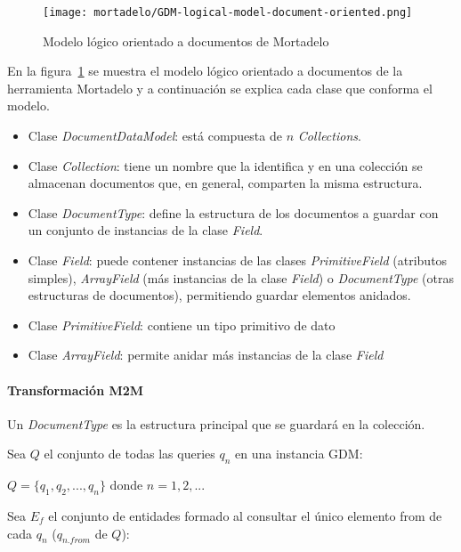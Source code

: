 \begin{figure}[h!t] 
    \centering
    \texttt{[image: mortadelo/GDM-logical-model-document-oriented.png]}
    \caption{Modelo lógico orientado a documentos de Mortadelo}
    \label{img:mortadelo-gdm-logical-model-document-oriented}
\end{figure}


En la figura~\ref{img:mortadelo-gdm-logical-model-document-oriented} se muestra el modelo lógico orientado a documentos de la herramienta Mortadelo y a continuación se explica cada clase que conforma el modelo.


\begin{itemize}
    \item Clase \textit{DocumentDataModel}: está compuesta de $n$ \textit{Collections}.
    \item Clase \textit{Collection}: tiene un nombre que la identifica y en una colección se almacenan documentos que, en general, comparten la misma estructura.
    \item Clase \textit{DocumentType}: define la estructura de los documentos a guardar con un conjunto de instancias de la clase \textit{Field}.
    \item Clase \textit{Field}: puede contener instancias de las clases \textit{PrimitiveField} (atributos simples), \textit{ArrayField} (más instancias de la clase \textit{Field}) o \textit{DocumentType} (otras estructuras de documentos), permitiendo guardar elementos anidados.
    \item Clase \textit{PrimitiveField}: contiene un tipo primitivo de dato
    \item Clase \textit{ArrayField}: permite anidar más instancias de la clase \textit{Field}
\end{itemize}

\paragraph*{Transformación M2M}


Un \textit{DocumentType} es la estructura principal que se guardará en la colección.


Sea $Q$ el conjunto de todas las queries $q_{n}$ en una instancia GDM:

\begin{center}
    $Q = \{q_{1}, q_{2},..., q_{n}\}$ donde $n=1,2,...$    
\end{center}

Sea $E_{f}$ el conjunto de entidades formado al consultar el único elemento from de cada $q_n$ ($q_{n.from}$ de $Q$): 

